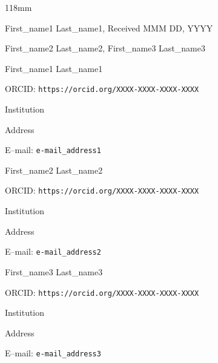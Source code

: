 \documentclass[11pt,a5paper,twoside]{article}
\begin{document}
\vspace{2mm}
\begin{center}
\begin{parbox}{118mm}{\footnotesize
First\_name1 Last\_name1,    \hfill Received MMM DD, YYYY

First\_name2 Last\_name2, First\_name3 Last\_name3

\vspace{3mm}

First\_name1 Last\_name1

ORCID: \texttt{https://orcid.org/XXXX-XXXX-XXXX-XXXX}

Institution

Address

E--mail: \texttt{e-mail\_address1}

\vspace{2mm}

First\_name2 Last\_name2

ORCID: \texttt{https://orcid.org/XXXX-XXXX-XXXX-XXXX}

Institution

Address

E--mail: \texttt{e-mail\_address2}

\vspace{2mm}

First\_name3 Last\_name3

ORCID: \texttt{https://orcid.org/XXXX-XXXX-XXXX-XXXX}

Institution

Address

E--mail: \texttt{e-mail\_address3}

}

\end{parbox}
\end{center}
\end{document}
